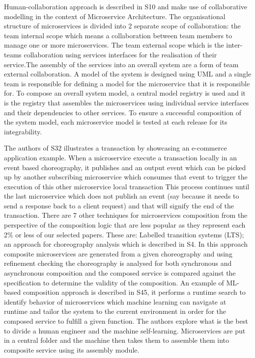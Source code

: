 \documentclass{article}
\begin{document}
\begin{multicols}{2}
Human-collaboration approach is described in S10 and make use of collaborative modelling in the context of Microservice Architecture. The organisational structure  of microservices is divided into 2 separate scope of collaboration: the team internal scope which means a collaboration between team members to manage one or more microservices. The team external scope which is the inter-teams collaboration using services interfaces for the realisation of their service.The assembly of the services into an overall system are a form of team external collaboration. A model of the system is designed using UML and a single team is responsible for defining a model for the microservice that it is responsible for. To compose an overall system model, a central model registry is used and it is the registry that assembles the microservices using individual service interfaces and their dependencies to other services. To ensure a successful composition of the system model, each microservice model is tested at each release for its integrability.

The authors of S32 illustrates a transaction by showcasing an  e-commerce application example. When a microservice execute a transaction locally in an event based choreography, it publishes and an output event which can be picked up by another subscribing microservice which consumes that event to trigger the execution of this other microservice local transaction This process continues until the last microservice which does not publish an event (say because it needs to send a response back to a client request) and that will signify the end of the transaction. There are 7 other techniques for microservices composition from the perspective of the composition logic that are less popular as they represent each 2\% or less of our selected papers. These are: Labelled transition systems (LTS); an approach for choreography analysis which is described in S4. In this approach composite microservices are generated from a given choreography and using refinement checking the choreography is analysed for both synchronous and asynchronous composition and the composed service is compared against the specification to determine the validity of the composition.
An example of ML-based composition approach is described in S45, it performs a runtime search to identify behavior of microservices which machine learning can navigate at runtime and tailor the system to the current environment in order for the composed service to fulfill a given function. The authors explore what is the best to divide a human engineer and the machine self-learning. Microservices are put in a central folder and the machine then takes them to assemble them into composite service using its assembly module. 


\end{multicols}
\end{document}
